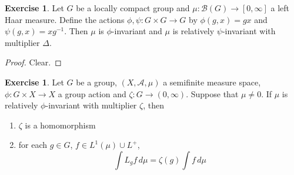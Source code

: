\documentclass{book}
\theoremstyle{definition}
\newtheorem{ex}[definition]{Exercise}
\newcommand{\Del}{\Delta}
\newcommand{\MA}{\mathcal{A}}
\newcommand{\MB}{\mathcal{B}}
\DeclareMathOperator*{\0}{\mbf{0}}
\DeclareMathOperator*{\1}{\mbf{1}}
\newcommand{\RG}{[0,\infty]}
\newcommand{\dmu}{\, d \mu}
\begin{document}
	\begin{ex}
		Let $G$ be a locally compact group and $\mu: \MB(G) \rightarrow \RG$ a left Haar measure. Define the actions $\phi, \psi : G \times G \rightarrow G$ by $\phi(g, x) = gx$ and $\psi(g, x) = xg^{-1}$. Then $\mu$ is $\phi$-invariant and $\mu$ is relatively $\psi$-invariant with multiplier $\Del$. 
	\end{ex}
	
	\begin{proof}
		Clear.
	\end{proof}

	\begin{ex}
		Let $G$ be a group, $(X, \MA, \mu)$ a semifinite measure space, $\phi: G \times X \rightarrow X$ a group action and $\zeta: G \rightarrow (0, \infty)$. Suppose that $\mu \neq 0$. If $\mu$ is relatively $\phi$-invariant with multiplier $\zeta$, then 
		\begin{enumerate}
			\item $\zeta$ is a homomorphism
			\item for each $g \in G$, $f \in L^1(\mu) \cup L^+$, $$\int L_g f \dmu = \zeta(g) \int f \dmu$$ 
		\end{enumerate} 
	\end{ex}
\end{document}

